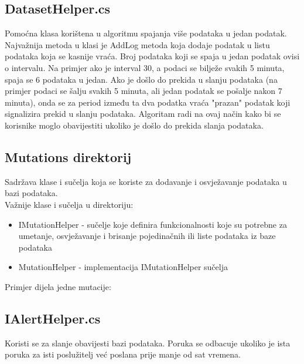 \documentclass[zavrsnirad]{fer}
\begin{document}


\subsection{DatasetHelper.cs}
\label{pog:dataset_helper}
Pomoćna klasa korištena u algoritmu spajanja više podataka u jedan podatak. Najvažnija metoda u klasi je AddLog metoda koja dodaje podatak u listu podataka koja se kasnije vraća. Broj podataka koji se spaja u jedan podatak ovisi o intervalu. Na primjer ako je interval 30, a podaci se bilježe svakih 5 minuta, spaja se 6 podataka u jedan. Ako je došlo do prekida u slanju podataka (na primjer podaci se šalju svakih 5 minuta, ali jedan podatak se pošalje nakon 7 minuta), onda se za period između ta dva podatka vraća "prazan" podatak koji signalizira prekid u slanju podataka. Algoritam radi na ovaj način kako bi se korisnike moglo obavijestiti ukoliko je došlo do prekida slanja podataka.


\subsection{Mutations direktorij}
Sadržava klase i sučelja koja se koriste za dodavanje i osvježavanje podataka u bazi podataka.
\\Važnije klase i sučelja u direktoriju:
\begin{itemize}
	\item IMutationHelper - sučelje koje definira funkcionalnosti koje su potrebne za umetanje, osvježavanje i brisanje pojedinačnih ili liste podataka iz baze podataka
	\item MutationHelper - implementacija IMutationHelper sučelja
\end{itemize}
Primjer dijela jedne mutacije:


\subsection{IAlertHelper.cs}
Koristi se za slanje obavijesti bazi podataka. Poruka se odbacuje ukoliko je ista poruka za isti poslužitelj već poslana prije manje od sat vremena.

\end{document}
